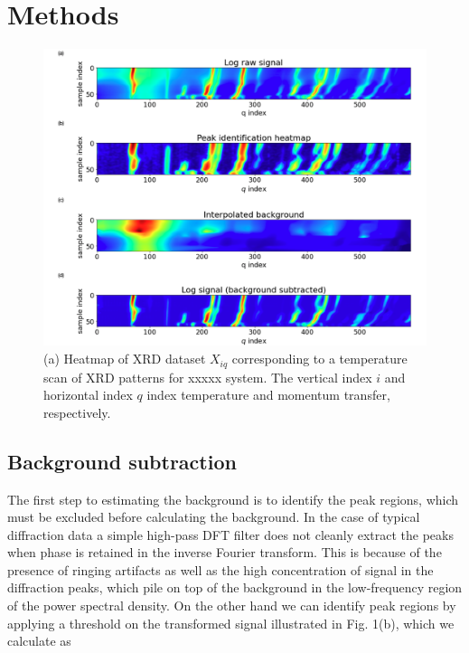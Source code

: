 \documentclass[12pt]{iopart}
\begin{document}
\section{Methods}
\begin{figure}
  \includegraphics[width=\linewidth]{figures/heatmaps.png}
  \caption{ (a) Heatmap of XRD dataset $X_{iq}$ corresponding to a temperature scan
of XRD patterns for xxxxx system. The vertical index $i$ and horizontal
index $q$ index temperature and momentum transfer, respectively. }
  \label{fig:heatmaps}
\end{figure}
%
%
\subsection{Background subtraction}
The first step to estimating the background is to identify the peak
regions, which must be excluded before calculating the background. In
the case of typical diffraction data a simple high-pass DFT filter does
not cleanly extract the peaks when phase is retained in the inverse
Fourier transform. This is because of the presence of ringing artifacts
as well as the high concentration of signal in the diffraction peaks,
which pile on top of the background in the low-frequency region of the
power spectral density. On the other hand we can identify peak regions
by applying a threshold on the transformed signal illustrated in Fig.
1(b), which we calculate as
\end{document}
